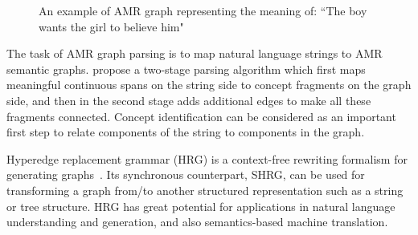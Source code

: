 \begin{figure}
\begin{center}
\caption{An example of AMR graph representing the meaning of: ``The boy wants the girl to believe him"}
\label{fig:amr-example}
\vspace{-1em}
\end{center}
\end{figure}
The task of AMR graph parsing 
is to map natural language strings to AMR semantic graphs.  propose a two-stage parsing
algorithm which first maps meaningful continuous spans on the string side to concept fragments
on the graph side, and then in the second stage adds additional edges to
make all these fragments connected. Concept identification \cite{flanigan2014discriminative,pourdamghanialigning} can be considered as an important first step to
relate components of the string to components in the graph.


Hyperedge replacement grammar (HRG) is a context-free rewriting formalism for generating graphs~\cite{drewes+al:1997}. 
Its synchronous counterpart, SHRG, can be used for transforming a graph from/to another structured representation such as a string
or tree structure. HRG has great potential for applications in natural language understanding and generation,
and also semantics-based machine translation. 


